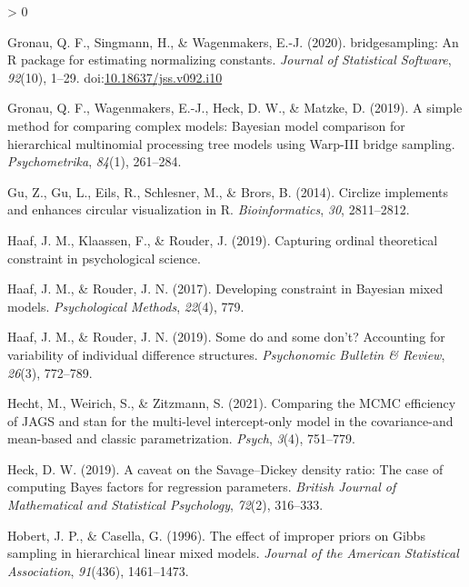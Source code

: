\documentclass[
  english,
  doc,floatsintext]{apa6}
\newlength{\cslhangindent}
\newenvironment{CSLReferences}[2] %
 {%
  \setlength{\parindent}{0pt}
  \ifodd #1 \everypar{\setlength{\hangindent}{\cslhangindent}}\ignorespaces\fi
  \ifnum #2 > 0
  \setlength{\parskip}{#2\baselineskip}
  \fi
 }%
 {}
\begin{document}
\begin{CSLReferences}{1}{0}
\leavevmode\hypertarget{ref-R-bridgesampling}{}%
Gronau, Q. F., Singmann, H., \& Wagenmakers, E.-J. (2020). {bridgesampling}: An {R} package for estimating normalizing constants. \emph{Journal of Statistical Software}, \emph{92}(10), 1--29. doi:\href{https://doi.org/10.18637/jss.v092.i10}{10.18637/jss.v092.i10}

\leavevmode\hypertarget{ref-gronau2019simple}{}%
Gronau, Q. F., Wagenmakers, E.-J., Heck, D. W., \& Matzke, D. (2019). A simple method for comparing complex models: {Bayesian} model comparison for hierarchical multinomial processing tree models using {Warp}-III bridge sampling. \emph{Psychometrika}, \emph{84}(1), 261--284.

\leavevmode\hypertarget{ref-R-circlize}{}%
Gu, Z., Gu, L., Eils, R., Schlesner, M., \& Brors, B. (2014). Circlize implements and enhances circular visualization in {R}. \emph{Bioinformatics}, \emph{30}, 2811--2812.

\leavevmode\hypertarget{ref-haaf2019capturing}{}%
Haaf, J. M., Klaassen, F., \& Rouder, J. (2019). Capturing ordinal theoretical constraint in psychological science.

\leavevmode\hypertarget{ref-haaf2017developing}{}%
Haaf, J. M., \& Rouder, J. N. (2017). Developing constraint in {Bayesian} mixed models. \emph{Psychological Methods}, \emph{22}(4), 779.

\leavevmode\hypertarget{ref-haaf2019some}{}%
Haaf, J. M., \& Rouder, J. N. (2019). Some do and some don't? Accounting for variability of individual difference structures. \emph{Psychonomic Bulletin \& Review}, \emph{26}(3), 772--789.

\leavevmode\hypertarget{ref-hecht2021comparing}{}%
Hecht, M., Weirich, S., \& Zitzmann, S. (2021). Comparing the MCMC efficiency of JAGS and stan for the multi-level intercept-only model in the covariance-and mean-based and classic parametrization. \emph{Psych}, \emph{3}(4), 751--779.

\leavevmode\hypertarget{ref-heck2019caveat}{}%
Heck, D. W. (2019). A caveat on the {Savage--Dickey} density ratio: The case of computing {Bayes} factors for regression parameters. \emph{British Journal of Mathematical and Statistical Psychology}, \emph{72}(2), 316--333.

\leavevmode\hypertarget{ref-hobert1996effect}{}%
Hobert, J. P., \& Casella, G. (1996). The effect of improper priors on {Gibbs} sampling in hierarchical linear mixed models. \emph{Journal of the American Statistical Association}, \emph{91}(436), 1461--1473.


\end{CSLReferences}
\end{document}
